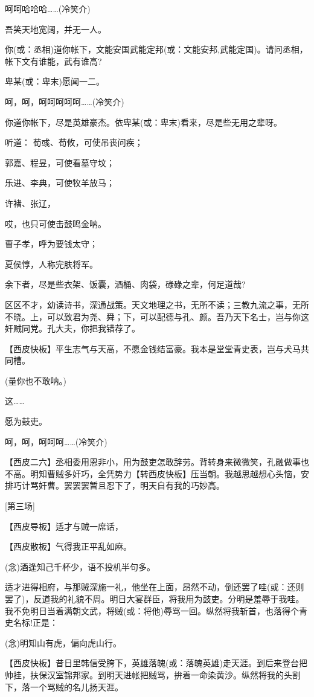 呵呵哈哈哈\ldots{}\ldots{}(冷笑介)

吾笑天地宽阔，并无一人。

你(或：丞相)道你帐下，文能安国武能定邦(或：文能安邦,武能定国)。请问丞相，帐下文有谁能，武有谁高?

卑某(或：卑末)愿闻一二。

呵，呵，呵呵呵呵呵\ldots{}\ldots{}(冷笑介)

你道你帐下，尽是英雄豪杰。依卑某(或：卑末)看来，尽是些无用之辈呀。

听道： 荀彧、荀攸，可使吊丧问疾；

郭嘉、程昱，可使看墓守坟；

乐进、李典，可使牧羊放马；

许褚、张辽，

哎，也只可使击鼓鸣金呐。

曹子孝，呼为要钱太守；

夏侯惇，人称完肤将军。

余下者，尽是些衣架、饭囊，酒桶、肉袋，碌碌之辈，何足道哉?

区区不才，幼读诗书，深通战策。天文地理之书，无所不读；三教九流之事，无所不晓。上，可以致君为尧、舜；下，可以配德与孔、颜。吾乃天下名士，岂与你这奸贼同党。孔大夫，你把我错荐了。

【西皮快板】平生志气与天高，不愿金钱结富豪。我本是堂堂青史表，岂与犬马共同槽。

(量你也不敢呐。)

这\ldots{}\ldots{}

愿为鼓吏。

呵，呵，呵呵呵\ldots{}\ldots{}(冷笑介)

【西皮二六】丞相委用恩非小，用为鼓吏怎敢辞劳。背转身来微微笑，孔融做事也不高。明知曹贼多奸巧，全凭势力【转西皮快板】压当朝。我越思越想心头恼，安排巧计骂奸曹。罢罢罢暂且忍下了，明天自有我的巧妙高。

{[}第三场{]}

【西皮导板】适才与贼一席话，

【西皮散板】气得我正平乱如麻。

(念)酒逢知己千杯少，语不投机半句多。

适才进得相府，与那贼深施一礼，他坐在上面，昂然不动，倒还罢了哇(或：还则罢了)，反道我的礼貌不周。明日大宴群臣，将我用为鼓吏。分明是羞辱于我哇。我不免明日当着满朝文武，将贼(或：将他)辱骂一回。纵然将我斩首，也落得个青史名标!正是：

(念)明知山有虎，偏向虎山行。

【西皮快板】昔日里韩信受胯下，英雄落魄(或：落魄英雄)走天涯。到后来登台把帅挂，扶保汉室锦邦家。到明天进帐把贼骂，拚着一命染黄沙。纵然将我的头割下，落一个骂贼的名儿扬天涯。

